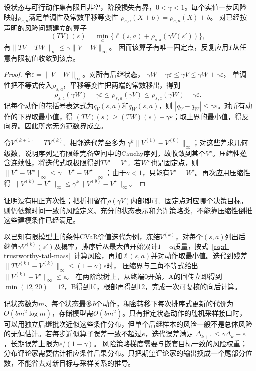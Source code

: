 \begin{theorem}[折扣风险算子的压缩性]
  \label{thm:rl-trustworthy-risk-contraction}
  设状态与可行动作集有限且非空，阶段损失有界，$0<\gamma<1$。每个实值一步风险映射$\rho_{s,a}$满足单调性及常数平移等变性
  $\rho_{s,a}(X+b)=\rho_{s,a}(X)+b$。
  对已经按声明的风险问题建立的算子
  \[
    (TV)(s)=\min_a\{\ell(s,a)+\rho_{s,a}(\gamma V(s'))\},
  \]
  有$\lVert TV-TW\rVert_\infty\leq\gamma\lVert V-W\rVert_\infty$。
  因而该算子有唯一固定点，反复应用$T$从任意有限初值收敛到该点。
\end{theorem}
\begin{proof}
  令$\varepsilon=\lVert V-W\rVert_\infty$。对所有后继状态，
  $\gamma W-\gamma\varepsilon\leq\gamma V\leq\gamma W+\gamma\varepsilon$。
  单调性把不等式传入$\rho_{s,a}$，平移等变性把两端的常数移出，得到
  \[
    \rho_{s,a}(\gamma W)-\gamma\varepsilon
      \leq\rho_{s,a}(\gamma V)
      \leq\rho_{s,a}(\gamma W)+\gamma\varepsilon.
  \]
  记每个动作的花括号表达式为$q_V(s,a)$和$q_W(s,a)$，则
  $|q_V-q_W|\leq\gamma\varepsilon$。对所有动作的下界取最小值，得
  $(TV)(s)\geq(TW)(s)-\gamma\varepsilon$；取上界的最小值，得反向界。因此所需无穷范数界成立。

  令$V^{(k+1)}=TV^{(k)}$。相邻迭代差至多为
  $\gamma^k\lVert V^{(1)}-V^{(0)}\rVert_\infty$；对这些差求几何级数，说明序列是有限维完备空间中的Cauchy序列，故收敛到某个$V^\star$。压缩性蕴含连续性，将迭代式取极限得到$TV^\star=V^\star$。若$W^\star$也是固定点，则
  $\lVert V^\star-W^\star\rVert_\infty\leq\gamma\lVert V^\star-W^\star\rVert_\infty$；由于$\gamma<1$，只能有$V^\star=W^\star$。再次应用压缩性得
  $\lVert V^{(k)}-V^\star\rVert_\infty\leq\gamma^k\lVert V^{(0)}-V^\star\rVert_\infty$。
\end{proof}

证明没有用正齐次性；把折扣留在$\rho(\gamma V)$内部即可。固定点对应哪个决策目标，则仍依赖时间一致的风险定义、充分的状态表示和允许策略类，不能靠压缩性倒推这些建模条件已经满足。

以已知有限模型上的条件CVaR价值迭代为例，冻结$V^{(k)}$，对每个$(s,a)$列出后继值$\gamma V^{(k)}(s')$及概率，排序后从最大值开始累计$1-\alpha$质量，按式~\eqref{eq:rl-trustworthy-tail-mass}~计算风险，再加$\ell(s,a)$并对动作取最小值。迭代到残差
$\lVert TV^{(k)}-V^{(k)}\rVert_\infty\leq(1-\gamma)\epsilon$时，
压缩界与三角不等式给出
$\lVert V^{(k)}-V^\star\rVert_\infty\leq\epsilon$。
在两阶段树上，从终端0开始，A的回传立即得到$\min(12,20)=12$，B得到10，根部再得到12，完成一次可复核的向后计算。

记状态数为$m$、每个状态最多$b$个动作，稠密转移下每次排序式更新的代价为$O(bm^2\log m)$，存储模型需$O(bm^2)$。只有指定状态动作的随机采样接口时，可以用独立后继批次近似这些条件分布，但单个后继样本的风险一般不是总体风险的无偏估计。若每步近似算子误差一致不超过$e$，迭代误差满足
$\Delta_{k+1}\leq\gamma\Delta_k+e$，长期误差上限为$e/(1-\gamma)$。
风险策略梯度需要与嵌套目标一致的风险权重；分布评论家需要估计相应条件后果分布。只把期望评论家的输出换成一个尾部分位数，不能省去对新目标与采样关系的推导。

